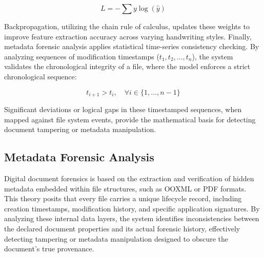 \documentclass[12pt, a4paper]{report}
\numberwithin{equation}{chapter}
\begin{document}
\begin{equation}
L = -\sum y \log(\hat{y})
\label{eq:cross_entropy}
\end{equation}

Backpropagation, utilizing the chain rule of calculus, updates these weights to improve feature extraction accuracy across varying handwriting styles. Finally, metadata forensic analysis applies statistical time-series consistency checking. By analyzing sequences of modification timestamps ($t_1, t_2, ..., t_n$), the system validates the chronological integrity of a file, where the model enforces a strict chronological sequence:

\begin{equation}
t_{i+1} > t_i, \quad \forall i \in \{1, \dots, n-1\}
\label{eq:timestamp_validation}
\end{equation}

Significant deviations or logical gaps in these timestamped sequences, when mapped against file system events, provide the mathematical basis for detecting document tampering or metadata manipulation.
\subsection{Metadata Forensic Analysis}
Digital document forensics is based on the extraction and verification of hidden metadata embedded within file structures, such as OOXML or PDF formats. This theory posits that every file carries a unique lifecycle record, including creation timestamps, modification history, and specific application signatures. By analyzing these internal data layers, the system identifies inconsistencies between the declared document properties and its actual forensic history, effectively detecting tampering or metadata manipulation designed to obscure the document's true provenance.
\end{document}
